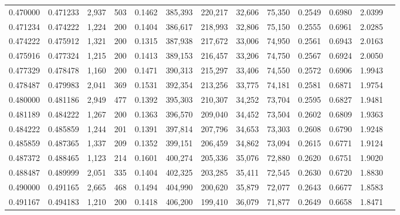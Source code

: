 \begin{tabular}{rrrrrrrrrrrrr}
0.470000 & 0.471233 & 2,937 & 503 &                                     0.1462 & 385,393 & 220,217 &  32,606 &  75,350 & 0.2549 & 0.6980 & 2.0399 \\
0.471234 & 0.474222 & 1,224 & 200 &                                     0.1404 & 386,617 & 218,993 &  32,806 &  75,150 & 0.2555 & 0.6961 & 2.0285 \\
0.474222 & 0.475912 & 1,321 & 200 &                                     0.1315 & 387,938 & 217,672 &  33,006 &  74,950 & 0.2561 & 0.6943 & 2.0163 \\
0.475916 & 0.477324 & 1,215 & 200 &                                     0.1413 & 389,153 & 216,457 &  33,206 &  74,750 & 0.2567 & 0.6924 & 2.0050 \\
0.477329 & 0.478478 & 1,160 & 200 &                                     0.1471 & 390,313 & 215,297 &  33,406 &  74,550 & 0.2572 & 0.6906 & 1.9943 \\
0.478487 & 0.479983 & 2,041 & 369 &                                     0.1531 & 392,354 & 213,256 &  33,775 &  74,181 & 0.2581 & 0.6871 & 1.9754 \\
0.480000 & 0.481186 & 2,949 & 477 &                                     0.1392 & 395,303 & 210,307 &  34,252 &  73,704 & 0.2595 & 0.6827 & 1.9481 \\
0.481189 & 0.484222 & 1,267 & 200 &                                     0.1363 & 396,570 & 209,040 &  34,452 &  73,504 & 0.2602 & 0.6809 & 1.9363 \\
0.484222 & 0.485859 & 1,244 & 201 &                                     0.1391 & 397,814 & 207,796 &  34,653 &  73,303 & 0.2608 & 0.6790 & 1.9248 \\
0.485859 & 0.487365 & 1,337 & 209 &                                     0.1352 & 399,151 & 206,459 &  34,862 &  73,094 & 0.2615 & 0.6771 & 1.9124 \\
0.487372 & 0.488465 & 1,123 & 214 &                                     0.1601 & 400,274 & 205,336 &  35,076 &  72,880 & 0.2620 & 0.6751 & 1.9020 \\
0.488487 & 0.489999 & 2,051 & 335 &                                     0.1404 & 402,325 & 203,285 &  35,411 &  72,545 & 0.2630 & 0.6720 & 1.8830 \\
0.490000 & 0.491165 & 2,665 & 468 &                                     0.1494 & 404,990 & 200,620 &  35,879 &  72,077 & 0.2643 & 0.6677 & 1.8583 \\
0.491167 & 0.494183 & 1,210 & 200 &                                     0.1418 & 406,200 & 199,410 &  36,079 &  71,877 & 0.2649 & 0.6658 & 1.8471 \\

\end{tabular}
